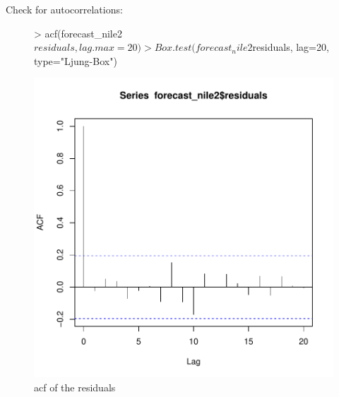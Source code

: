 \documentclass[11pt, a4paper]{article} %
\begin{document}
Check for autocorrelations:
\begin{figure}
\centering
\begin{Schunk}
\begin{Sinput}
> acf(forecast_nile2$residuals, lag.max = 20)
> Box.test(forecast_nile2$residuals, lag=20, type="Ljung-Box")
\end{Sinput}
\end{Schunk}
\includegraphics{alles-045}
\caption{acf of the residuals}
\end{figure}
\end{document}
